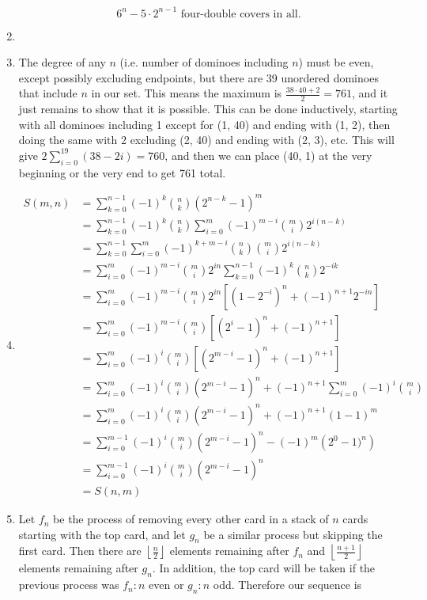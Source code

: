 \documentclass{book}
\numberwithin{equation}{section}
\begin{document}
\begin{enumerate}[label={9.\arabic*}]
$$6^n - 5\cdot 2^{n-1} \text{ four-double covers in all.}$$

\item

\item
The degree of any $n$ (i.e. number of dominoes including $n$) must be even, except possibly excluding endpoints,
but there are 39 unordered dominoes that include $n$ in our set. This means the maximum is $\frac{38\cdot 40 + 2}{2} = 761$,
and it just remains to show that it is possible. This can be done inductively, starting with all dominoes including 1 except
for (1, 40) and ending with (1, 2), then doing the same with 2 excluding (2, 40) and ending with (2, 3), etc. This will give
$2\sum_{i=0}^{19} (38 - 2i) = 760$, and then we can place (40, 1) at the very beginning or the very end to get 761 total.

\item
\begin{align*}
S(m, n) & = \sum_{k=0}^{n-1} (-1)^k {n \choose k}(2^{n-k} - 1)^m \\
& = \sum_{k=0}^{n-1} (-1)^k {n \choose k}\sum_{i=0}^m (-1)^{m-i} {m \choose i} 2^{i(n-k)} \\
& = \sum_{k=0}^{n-1} \sum_{i=0}^m (-1)^{k+m-i} {n \choose k} {m \choose i} 2^{i(n-k)} \\
& = \sum_{i=0}^{m} (-1)^{m-i} {m \choose i} 2^{in} \sum_{k=0}^{n-1} (-1)^k {n \choose k} 2^{-ik} \\
& = \sum_{i=0}^{m} (-1)^{m-i} {m \choose i} 2^{in} \left[ \left( 1 - 2^{-i} \right)^n + (-1)^{n+1}2^{-in} \right] \\
& = \sum_{i=0}^{m} (-1)^{m-i} {m \choose i} \left[ \left( 2^i - 1 \right)^n + (-1)^{n+1} \right] \\
& = \sum_{i=0}^{m} (-1)^i {m \choose i} \left[ \left( 2^{m-i} - 1 \right)^n + (-1)^{n+1} \right] \\
& = \sum_{i=0}^{m} (-1)^i {m \choose i} \left( 2^{m-i} - 1 \right)^n + (-1)^{n+1}\sum_{i=0}^{m} (-1)^i {m \choose i} \\
& = \sum_{i=0}^{m} (-1)^i {m \choose i} \left( 2^{m-i} - 1 \right)^n + (-1)^{n+1}(1 - 1)^m \\
& = \sum_{i=0}^{m - 1} (-1)^i {m \choose i} \left( 2^{m-i} - 1 \right)^n - (-1)^m \left(2^0 - 1)^n\right) \\
& = \sum_{i=0}^{m - 1} (-1)^i {m \choose i} \left( 2^{m-i} - 1 \right)^n \\
& = S(n, m)
\end{align*}

\item
Let $f_n$ be the process of removing every other card in a stack of $n$ cards starting with the top card, and let $g_n$
be a similar process but skipping the first card. Then there are $\left\lfloor \frac{n}{2} \right\rfloor$ elements
remaining after $f_n$ and $\left\lfloor \frac{n+1}{2} \right\rfloor$ elements remaining after $g_n$. In addition,
the top card will be taken if the previous process was $f_n : n$ even or $g_n : n$ odd. Therefore our sequence is


\end{enumerate}
\end{document}
